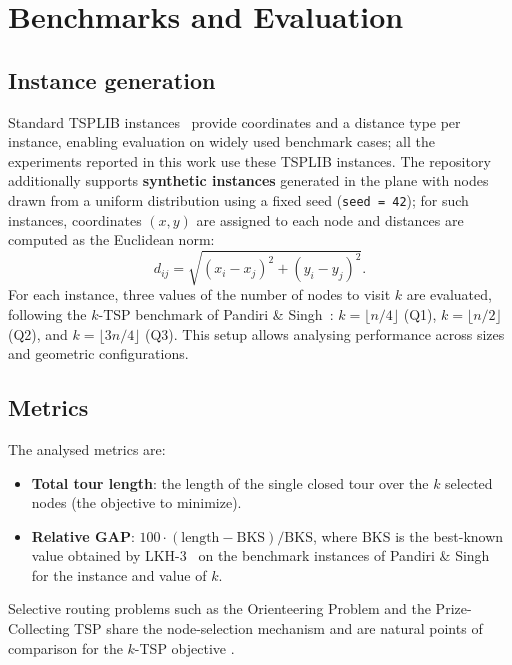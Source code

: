 \documentclass[conference]{IEEEtran}
\begin{document}
\section{Benchmarks and Evaluation}
\subsection*{Instance generation}
Standard TSPLIB instances~\cite{TSPLIB} provide coordinates and a distance type per instance, enabling evaluation on widely used benchmark cases; all the experiments reported in this work use these TSPLIB instances. The repository additionally supports \textbf{synthetic instances} generated in the plane with nodes drawn from a uniform distribution using a fixed seed (\texttt{seed = 42}); for such instances, coordinates $(x,y)$ are assigned to each node and distances are computed as the Euclidean norm:
\[
  d_{ij}=\sqrt{(x_i-x_j)^2+(y_i-y_j)^2}.
\]
For each instance, three values of the number of nodes to visit $k$ are evaluated, following the $k$-TSP benchmark of Pandiri \& Singh~\cite{pandiri2020}: $k=\lfloor n/4\rfloor$ (Q1), $k=\lfloor n/2\rfloor$ (Q2), and $k=\lfloor 3n/4\rfloor$ (Q3). This setup allows analysing performance across sizes and geometric configurations.

\subsection*{Metrics}
The analysed metrics are:
\begin{itemize}
    \item \textbf{Total tour length}: the length of the single closed tour over the $k$ selected nodes (the objective to minimize).
    \item \textbf{Relative GAP}: $100\cdot(\text{length}-\text{BKS})/\text{BKS}$, where BKS is the best-known value obtained by LKH-3~\cite{Helsgaun} on the benchmark instances of Pandiri \& Singh~\cite{pandiri2020} for the instance and value of $k$.
\end{itemize}
Selective routing problems such as the Orienteering Problem and the Prize-Collecting TSP share the node-selection mechanism and are natural points of comparison for the $k$-TSP objective \cite{vansteenwegen2011top}.

\end{document}
